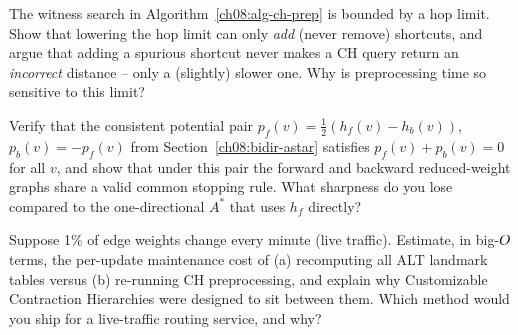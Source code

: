 \begin{exercise}
\label{ch08:ex-witness}
The witness search in Algorithm~\ref{ch08:alg-ch-prep} is bounded by a hop limit.
Show that lowering the hop limit can only \emph{add} (never remove) shortcuts,
and argue that adding a spurious shortcut never makes a CH query return an
\emph{incorrect} distance -- only a (slightly) slower one. Why is preprocessing
time so sensitive to this limit?
\end{exercise}

\begin{exercise}
\label{ch08:ex-bidir-astar}
Verify that the consistent potential pair
$p_f(v)=\tfrac12(h_f(v)-h_b(v))$, $p_b(v)=-p_f(v)$ from
Section~\ref{ch08:bidir-astar} satisfies $p_f(v)+p_b(v)=0$ for all $v$, and show
that under this pair the forward and backward reduced-weight graphs share a valid
common stopping rule. What sharpness do you lose compared to the one-directional
$A^*$ that uses $h_f$ directly?
\end{exercise}

\begin{exercise}
\label{ch08:ex-traffic}
Suppose 1\% of edge weights change every minute (live traffic). Estimate, in
big-$O$ terms, the per-update maintenance cost of (a) recomputing all ALT
landmark tables versus (b) re-running CH preprocessing, and explain why
Customizable Contraction Hierarchies were designed to sit between them. Which
method would you ship for a live-traffic routing service, and why?
\end{exercise}
